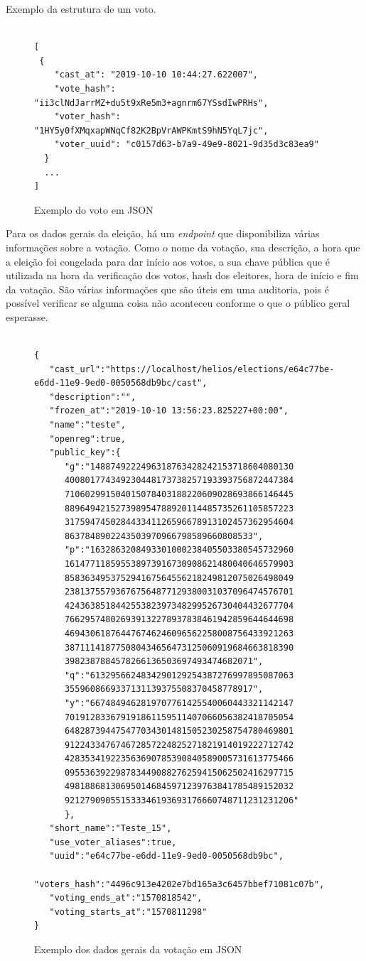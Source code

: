 \documentclass{ufsctex/ufsctex}
\begin{document}
Exemplo da estrutura de um voto.

\begin{figure}[H]
\centering
\begin{lstlisting}[numbers=none]

[
 {
    "cast_at": "2019-10-10 10:44:27.622007",
    "vote_hash": "ii3clNdJarrMZ+du5t9xRe5m3+agnrm67YSsdIwPRHs",
    "voter_hash": "1HY5y0fXMqxapWNqCf82K2BpVrAWPKmtS9hN5YqL7jc",
    "voter_uuid": "c0157d63-b7a9-49e9-8021-9d35d3c83ea9"
  }
  ...
]

\end{lstlisting}
	\caption{Exemplo do voto em JSON}
\end{figure}

Para os dados gerais da eleição, há um \textit{endpoint} que disponibiliza
várias informações sobre a votação. Como o nome da votação, sua descrição, a
hora que a eleição foi congelada para dar início aos votos, a sua chave pública
que é utilizada na hora da verificação dos votos, hash dos eleitores, hora de
início e fim da votação. São várias informações que são úteis em uma auditoria,
pois é possível verificar se alguma coisa não aconteceu conforme o que o
público geral esperasse.

\begin{figure}[H]
\centering
\begin{lstlisting}[numbers=none]

{
   "cast_url":"https://localhost/helios/elections/e64c77be-e6dd-11e9-9ed0-0050568db9bc/cast",
   "description":"",
   "frozen_at":"2019-10-10 13:56:23.825227+00:00",
   "name":"teste",
   "openreg":true,
   "public_key":{
	  "g":"1488749222496318763428242153718604080130
	  400801774349230448173738257193393756872447384
	  710602991504015078403188220609028693866146445
	  889649421527398954788920114485735261105857223
	  317594745028443341126596678913102457362954604
	  8637848902243503970966798589660808533",
	  "p":"1632863208493301000238405503380545732960
	  161477118595538973916730908621480040646579903
	  858363495375294167564556218249812075026498049
	  238137557936767564877129380031037096474576701
	  424363851844255382397348299526730404432677704
	  766295748026939132278937838461942859644644698
	  469430618764476746246096562258008756433921263
	  387111418775080434656473125060919684663818390
	  3982387884578266136503697493474682071",
	  "q":"6132956624834290129254387276997895087063
	  3559608669337131139375508370458778917",
	  "y":"6674849462819707761425540060443321142147
	  701912833679191861159511407066056382418705054
	  648287394475477034301481505230258754780469801
	  912243347674672857224825271821914019222712742
	  428353419223563690785390840589005731613775466
	  095536392298783449088276259415062502416297715
	  498188681306950146845971239763841785489152032
	  921279090551533346193693176660748711231231206"
	  },
   "short_name":"Teste_15",
   "use_voter_aliases":true,
   "uuid":"e64c77be-e6dd-11e9-9ed0-0050568db9bc",
   "voters_hash":"4496c913e4202e7bd165a3c6457bbef71081c07b",
   "voting_ends_at":"1570818542",
   "voting_starts_at":"1570811298"
}

\end{lstlisting}
	\caption{Exemplo dos dados gerais da votação em JSON}
\end{figure}
\end{document}
